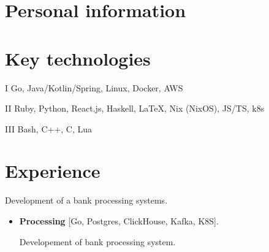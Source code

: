 \documentclass{cv}
\begin{document}
\iftrue

	\section{Personal information}




\fi


\section{Key technologies}

\begin{cvblock}{I}
	Go, Java/Kotlin/Spring, Linux, Docker, AWS
\end{cvblock}

\begin{cvblock}{II}
	Ruby, Python, React.js, Haskell, \LaTeX, Nix (NixOS), JS/TS, k8s
\end{cvblock}

\begin{cvblock}{III}
	Bash, C++, C, Lua
\end{cvblock}


\section{Experience}

\begin{cvblock}{%
		}

	Development of a bank processing systems.

	\begin{itemize}
		\item \textbf{Processing} [Go, Postgres, ClickHouse, Kafka, K8S].

					Developement of bank processing system.
	\end{itemize}
\end{cvblock}
\end{document}
